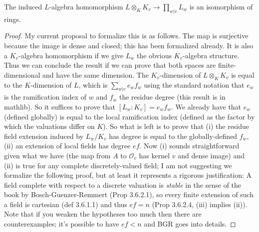 \begin{theorem}
  \label{IsDedekindDomain.HeightOneSpectrum.adicCompletionComapAlgEquiv}
  \leanok
  The induced $L$-algebra homomorphism $L\otimes_KK_v\to\prod_{w|v}L_w$ is an
  isomorphism of rings.
\end{theorem}
\begin{proof}

  My current proposal to formalize this is as follows. The map is surjective
  because the image is dense and closed; this has been formalized already.
  It is also a $K_v$-algebra homomorphism if we give $L_w$ the obvious $K_v$-algebra
  structure. Thus we can conclude the result if we can prove that both spaces are
  finite-dimensional and have the same dimension. The $K_v$-dimension of $L\otimes_KK_v$
  is equal to the $K$-dimension of $L$, which is $\sum_{w|v}e_wf_w$ using the standard
  notation that $e_w$ is the ramification index of $w$ and $f_w$ the residue degree
  (this result is in mathlib). So it suffices to prove that $[L_w:K_v]=e_wf_w$.
  We already have that $e_w$ (defined globally) is equal to the local ramification
  index (defined as the factor by which the valuations differ on $K$). So what is left
  is to prove that (i) the residue field extension induced by $L_w/K_v$ has degree is equal to the
  globally-defined $f_w$, (ii) an extension of local fields has degree $ef$. Now (i) sounds
  straightforward given what we have (the map from $A$ to $\mathcal{O}_v$ has kernel $v$ and
  dense image) and (ii) is true for any complete discretely-valued field; I am not suggesting
  we formalize the following proof, but at least it represents a rigorous justification:
  A field complete with respect to a discrete valuation is \emph{stable} in the sense
  of the book by Bosch-Guenzer-Remmert (Prop 3.6.2.1), so every finite extension of such a field
  is cartesian (def 3.6.1.1) and thus $ef=n$ (Prop 3.6.2.4, (iii) implies (ii)). Note
  that if you weaken the hypotheses too much then there are counterexamples; it's possible
  to have $ef<n$ and BGR goes into details.


\end{proof}
